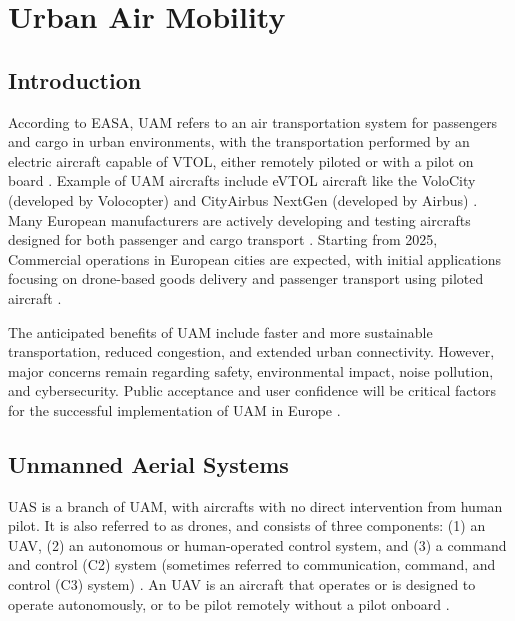 \section{Urban Air Mobility}

\subsection{Introduction}

According to \gls{EASA}, \gls{UAM} refers to an air transportation system for passengers and cargo in urban environments, with the transportation performed by an electric aircraft capable of \gls{VTOL}, either remotely piloted or with a pilot on board \cite{easa_uam}. 
Example of \gls{UAM} aircrafts include \gls{eVTOL} aircraft like the VoloCity (developed by Volocopter) and CityAirbus NextGen (developed by Airbus) \cite{gomez2024uam}.
Many European manufacturers are actively developing and testing aircrafts designed for both passenger and cargo transport \cite{gomez2024uam}.
Starting from 2025, Commercial operations in European cities are expected, with initial applications focusing on drone-based goods delivery and passenger transport using piloted aircraft  \cite{easa_uam}. 

The anticipated benefits of \gls{UAM} include faster and more sustainable transportation, reduced congestion, and extended urban connectivity. 
However, major concerns remain regarding safety, environmental impact, noise pollution, and cybersecurity.
Public acceptance and user confidence will be critical factors for the successful implementation of \gls{UAM} in Europe \cite{easa_uamlandscape}.



\subsection{Unmanned Aerial Systems}

\Gls{UAS} is a branch of \gls{UAM}, with aircrafts with no direct intervention from human pilot.
It is also referred to as drones, and consists of three components: (1) an \gls{UAV}, (2) an autonomous or human-operated control system, and (3) a command and control (C2) system (sometimes referred to communication, command, and control (C3) system) \cite{skybrary_uas}.
An \gls{UAV} is an aircraft that operates or is designed to operate autonomously, or to be pilot remotely without a pilot onboard \cite{skybrary_uas}.


